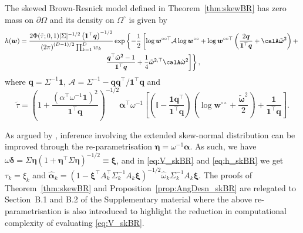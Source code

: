 \documentclass[12pt]{article}
\begin{document}
\begin{proposition}
\label{prop:AngDesn_skBR}
The skewed Brown-Resnick model defined in Theorem~\ref{thm:skewBR} has zero mass on $\partial\Omega$ and its density on $\Omega^\circ$ is given by
%
\begin{multline}
\label{eq:h_skBR}
h(\bm w) =\frac{2\Phi(\tilde{\tau};0,1)| \Sigma |^{-1/2} \left( \bm 1^\top \bm q\right)^{-1/2}}{\left( 2\pi \right)^{(D-1)/2}\prod_{k=1}^D w_k}\exp \left\{ -\frac{1}{2} \left[ \log \bm w^{\circ\circ\top} \mathcal{A} \log \bm w^{\circ\circ} + \log \bm w^{\circ\circ\top} \left( \frac{2 \bm q}{\bm 1^\top \bm q} + \calA\tilde{\bm\omega}^2\right) + \right.\right. \\ 
\left.\left. \frac{\bm q^\top\tilde{\bm \omega}^2 - 1}{\bm 1 ^\top \bm q} + \frac{1}{4}\tilde{\bm\omega}^{2,\top}\calA\tilde{\bm\omega}^2 \right]\right\},
\end{multline}%
where $\bm q = \Sigma^{-1} \bm 1$, $\mathcal{A} = \Sigma^{-1} - \bm q \bm q^\top / \bm 1^\top \bm q$ and  
$$\tilde{\tau}=\left(1 + \frac{\left(\alpha^\top\omega^{-1}\bm 1\right)^2}{\bm 1^\top \bm q} \right)^{-1/2} \bm\alpha^\top\omega^{-1}\left[\left(\mathbb{I} - \frac{\bm 1\bm q^\top}{\bm 1^\top \bm q}\right)\left(\log \bm w^{\circ\circ} + \frac{\tilde{\bm\omega}^2}{2}\right) +  \frac{\bm 1}{\bm 1^\top\bm q}  \right].$$
\end{proposition}

As argued by \citet[][Section~5.2]{Azzalini:2013}, inference involving the extended skew-normal distribution can be improved through the re-parametrisation $\bm \eta = \omega^{-1} \bm \alpha$. As such, we have $\omega \bm \delta = \Sigma \bm \eta \left( 1+\bm \eta^\top \Sigma \bm \eta\right)^{-1/2} \equiv \bm \xi$, and in \eqref{eq:V_skBR} and \eqref{eq:h_skBR} we get $\tau_k = \xi_k$ and $\hat{\bm\alpha}_k = \left(1-\bm\xi^\top A_k^\top\Sigma_k^{-1} A_k \bm\xi \right)^{-1/2} \hat{ \omega}_k\Sigma_k^{-1}A_k \bm\xi$. The proofs of Theorem~\ref{thm:skewBR} and Proposition~\ref{prop:AngDesn_skBR} are relegated to Section~B.1 and B.2 of the Supplementary material where the above re-parametrisation is also introduced to highlight the reduction in computational complexity of evaluating \eqref{eq:V_skBR}.
\end{document}

